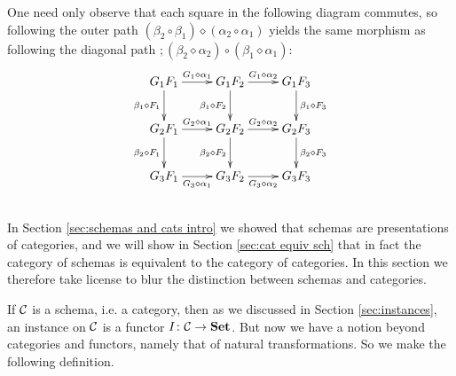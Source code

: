 \documentclass[CT4S-EN-RU]{subfiles}
\begin{document}
\begin{theoremRUS}
\end{theoremRUS}

\begin{proofENG}
One need only observe that each square in the following diagram commutes, so following the outer path $(\beta_2\circ\beta_1)\diamond(\alpha_2\circ\alpha_1)$ yields the same morphism as following the diagonal path $;(\beta_2\diamond\alpha_2)\circ(\beta_1\diamond\alpha_1)$:
$$
\xymatrix{
G_1F_1\ar[r]^{G_1\diamond\alpha_1}\ar[d]_{\beta_1\diamond F_1}&G_1F_2\ar[r]^{G_1\diamond\alpha_2}\ar[d]_{\beta_1\diamond F_2}&G_1F_3\ar[d]^{\beta_1\diamond F_3}\\
G_2F_1\ar[r]^{G_2\diamond\alpha_1}\ar[d]_{\beta_2\diamond F_1}&G_2F_2\ar[r]^{G_2\diamond\alpha_2}\ar[d]_{\beta_2\diamond F_2}&G_2F_3\ar[d]^{\beta_2\diamond F_3}\\
G_3F_1\ar[r]_{G_3\diamond\alpha_1}&G_3F_2\ar[r]_{G_3\diamond\alpha_2}&G_3F_3
}
$$
\end{proofENG}

\begin{proofRUS}
\end{proofRUS}


\subsection{}

\begin{blockENG}
In Section \ref{sec:schemas and cats intro} we showed that schemas are presentations of categories, and we will show in Section \ref{sec:cat equiv sch} that in fact the category of schemas is equivalent to the category of categories. In this section we therefore take license to blur the distinction between schemas and categories.
\end{blockENG}

\begin{blockRUS}
\end{blockRUS}

\begin{blockENG}
If $\mathcal{C}$ is a schema, i.e. a category, then as we discussed in Section \ref{sec:instances}, an instance on $\mathcal{C}$ is a functor $I\colon\mathcal{C}\rightarrow{\bf Set}$. But now we have a notion beyond categories and functors, namely that of natural transformations. So we make the following definition.
\end{blockENG}
\end{document}
